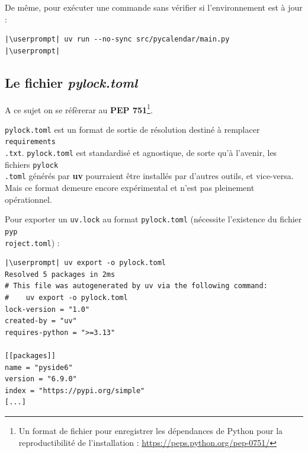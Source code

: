 De même, pour exécuter une commande sans vérifier si l'environnement est à jour :
\begin{lstlisting}[style=bash]
|\userprompt| uv run --no-sync src/pycalendar/main.py
|\userprompt|
\end{lstlisting}

\subsection*{Le fichier \textit{pylock.toml}}
A ce sujet on se réfèrerar au \textbf{PEP 751}\footnote{Un format de fichier pour enregistrer les dépendances de Python pour la reproductibilité de l'installation : \url{https://peps.python.org/pep-0751/}}.

\texttt{pylock.toml} est un format de sortie de résolution destiné à remplacer \texttt{requirements\\.txt}. \texttt{pylock.toml} est standardisé et agnostique, de sorte qu'à l'avenir, les fichiers \texttt{pylock\\.toml} générés par \textbf{uv} pourraient être installés par d'autres outils, et vice-versa. Mais ce format demeure encore expérimental et n'est pas pleinement opérationnel.

Pour exporter un \texttt{uv.lock} au format \texttt{pylock.toml} (nécessite l'existence du fichier \texttt{pyp\\roject.toml}) : 
\begin{lstlisting}[style=bash]
|\userprompt| uv export -o pylock.toml
Resolved 5 packages in 2ms
# This file was autogenerated by uv via the following command:
#    uv export -o pylock.toml
lock-version = "1.0"
created-by = "uv"
requires-python = ">=3.13"

[[packages]]
name = "pyside6"
version = "6.9.0"
index = "https://pypi.org/simple"
[...]
\end{lstlisting}

